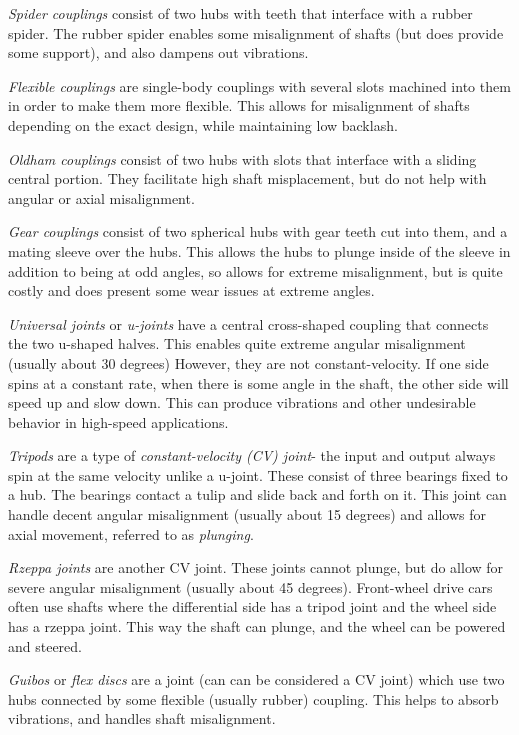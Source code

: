 	\begin{asparaenum}[a)]
		\item \textit{Spider couplings} consist of two hubs with teeth that interface with a rubber spider. The rubber spider enables some misalignment of shafts (but does provide some support), and also dampens out vibrations.
		\item \textit{Flexible couplings} are single-body couplings with several slots machined into them in order to make them more flexible. This allows for misalignment of shafts depending on the exact design, while maintaining low backlash.
		\item \textit{Oldham couplings} consist of two hubs with slots that interface with a sliding central portion. They facilitate high shaft misplacement, but do not help with angular or axial misalignment.
		\item \textit{Gear couplings} consist of two spherical hubs with gear teeth cut into them, and a mating sleeve over the hubs. This allows the hubs to plunge inside of the sleeve in addition to being at odd angles, so allows for extreme misalignment, but is quite costly and does present some wear issues at extreme angles.
		\item \textit{Universal joints} or \textit{u-joints} have a central cross-shaped coupling that connects the two u-shaped halves. This enables quite extreme angular misalignment (usually about 30 degrees) However, they are not constant-velocity. If one side spins at a constant rate, when there is some angle in the shaft, the other side will speed up and slow down. This can produce vibrations and other undesirable behavior in high-speed applications.
		\item \textit{Tripods} are a type of \textit{constant-velocity (CV) joint}- the input and output always spin at the same velocity unlike a u-joint. These consist of three bearings fixed to a hub. The bearings contact a tulip and slide back and forth on it. This joint can handle decent angular misalignment (usually about 15 degrees) and allows for axial movement, referred to as \textit{plunging}.
		\item \textit{Rzeppa joints} are another CV joint. These joints cannot plunge, but do allow for severe angular misalignment (usually about 45 degrees). Front-wheel drive cars often use shafts where the differential side has a tripod joint and the wheel side has a rzeppa joint. This way the shaft can plunge, and the wheel can be powered and steered.
		\item \textit{Guibos} or \textit{flex discs} are a joint (can can be considered a CV joint) which use two hubs connected by some flexible (usually rubber) coupling. This helps to absorb vibrations, and handles shaft misalignment.
	\end{asparaenum}

